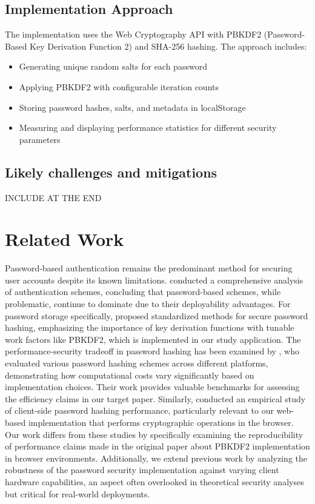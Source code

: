 \documentclass[11pt,a4paper]{article}
\begin{document}
            \subsection{Implementation Approach} 
            The implementation uses the Web Cryptography API with PBKDF2 (Password-Based Key Derivation Function 2) and SHA-256 hashing. The approach includes:
            \begin{itemize}
              \item Generating unique random salts for each password
              \item Applying PBKDF2 with configurable iteration counts
              \item Storing password hashes, salts, and metadata in localStorage
              \item Measuring and displaying performance statistics for different security parameters
            \end{itemize}
            \subsection{Likely challenges and mitigations} 
            INCLUDE AT THE END 


\section{Related Work}
Password-based authentication remains the predominant method for securing user accounts despite its known limitations. \cite{bonneau2012quest} conducted a comprehensive analysis of authentication schemes, concluding that password-based schemes, while problematic, continue to dominate due to their deployability advantages. For password storage specifically, \cite{turan2018recommendation} proposed standardized methods for secure password hashing, emphasizing the importance of key derivation functions with tunable work factors like PBKDF2, which is implemented in our study application.
The performance-security tradeoff in password hashing has been examined by \cite{visconti2020evaluate}, who evaluated various password hashing schemes across different platforms, demonstrating how computational costs vary significantly based on implementation choices. Their work provides valuable benchmarks for assessing the efficiency claims in our target paper. Similarly, \cite{pesante2021empirical} conducted an empirical study of client-side password hashing performance, particularly relevant to our web-based implementation that performs cryptographic operations in the browser. Our work differs from these studies by specifically examining the reproducibility of performance claims made in the original paper about PBKDF2 implementation in browser environments. Additionally, we extend previous work by analyzing the robustness of the password security implementation against varying client hardware capabilities, an aspect often overlooked in theoretical security analyses but critical for real-world deployments.
\end{document}
